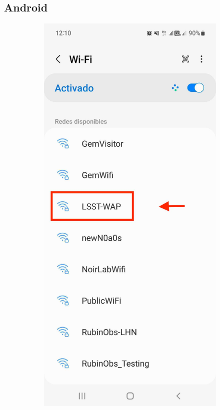   \subsection{Android}
  \begin{figure}
    \centering
    \begin{subfigure}{0.30\textwidth}
      \includegraphics[width=\textwidth]{Images/Android1.jpg}

\end{subfigure}
\end{figure}
